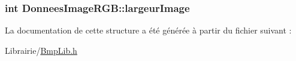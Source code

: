\subsubsection[{\texorpdfstring{largeur\+Image}{largeurImage}}]{\setlength{\rightskip}{0pt plus 5cm}int Donnees\+Image\+R\+G\+B\+::largeur\+Image}\hypertarget{struct_donnees_image_r_g_b_a371e9e6a48ebd26478d635b18b8cbce0}{}\label{struct_donnees_image_r_g_b_a371e9e6a48ebd26478d635b18b8cbce0}


La documentation de cette structure a été générée à partir du fichier suivant \+:\begin{DoxyCompactItemize}
\item 
Librairie/\hyperlink{_bmp_lib_8h}{Bmp\+Lib.\+h}\end{DoxyCompactItemize}

